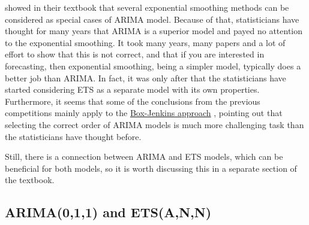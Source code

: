 \documentclass[
]{book}
\theoremstyle{definition}
\theoremstyle{definition}
\theoremstyle{definition}
\theoremstyle{definition}
\theoremstyle{remark}
\begin{document}
\citet{Box1976} showed in their textbook that several exponential smoothing methods can be considered as special cases of ARIMA model. Because of that, statisticians have thought for many years that ARIMA is a superior model and payed no attention to the exponential smoothing. It took many years, many papers and a lot of effort \citep[see, for example,][\citet{Fildes1998}, \citet{Makridakis2000}]{Makridakis1982} to show that this is not correct, and that if you are interested in forecasting, then exponential smoothing, being a simpler model, typically does a better job than ARIMA. In fact, it was only after \citet{Ord1997} that the statisticians have started considering ETS as a separate model with its own properties. Furthermore, it seems that some of the conclusions from the previous competitions mainly apply to the \protect\hyperlink{BJApproach}{Box-Jenkins approach} \citep[for example, see][]{Makridakis1997}, pointing out that selecting the correct order of ARIMA models is much more challenging task than the statisticians have thought before.

Still, there is a connection between ARIMA and ETS models, which can be beneficial for both models, so it is worth discussing this in a separate section of the textbook.

\hypertarget{ARIMAETS011}{%
\subsection{ARIMA(0,1,1) and ETS(A,N,N)}\label{ARIMAETS011}}
\end{document}
